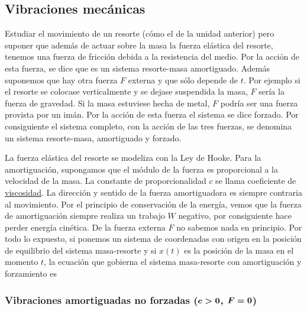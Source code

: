 \subsection{Vibraciones mecánicas }
\begin{problema} Estudiar el movimiento de un resorte (cómo el de la unidad
anterior) pero suponer que además de actuar sobre la masa la fuerza elástica del
resorte,
tenemos una fuerza de fricción debida a la resistencia del medio. Por la acción de esta fuerza, se dice que es un sistema resorte-masa amortiguado.
Además suponemos que hay otra fuerza $F$ externa y que sólo depende de $t$. Por ejemplo si el resorte se colocase verticalmente y se dejase suspendida
la masa, $F$ sería la fuerza de gravedad. Si la masa estuviese hecha de metal, $F$ podría ser una fuerza provista por un imán. Por la acción de esta fuerza el sistema se
dice forzado. Por consiguiente el sistema completo, con la acción de las tres fuerzas, se denomina un sistema resorte-masa, amortiguado y forzado.
\end{problema}

La fuerza elástica del resorte se modeliza con la Ley de Hooke.
Para la amortiguación, supongamos que el módulo de la fuerza es proporcional a
la velocidad de la masa. La constante de proporcionalidad $c$ se llama
coeficiente de
\href{http://es.wikipedia.org/wiki/Viscosidad}{viscosidad}. La dirección y sentido de la fuerza amortiguadora es siempre contraria
al movimiento. Por el principio de conservación de la energía, vemos que la fuerza de amortiguación siempre realiza un trabajo $W$ negativo, por consiguiente
hace perder energía cinética. De la fuerza externa $F$ no sabemos nada en principio. Por todo lo expuesto, si ponemos un sistema
de coordenadas con origen en la posición de equilibrio del sistema masa-resorte y si $x(t)$ es la posición de la masa en el momento $t$, la ecuación que gobierna
el sistema masa-resorte con amortiguación y forzamiento es


\subsubsection{Vibraciones amortiguadas no forzadas ($\b{c>0}$, $\b{F=0}$) }

